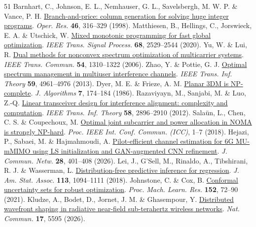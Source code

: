 \documentclass[10pt,letterpaper]{article}
\begin{document}
\begin{thebibliography}{51}
 Barnhart, C., Johnson, E. L., Nemhauser, G. L., Savelsbergh, M. W. P. \& Vance, P. H. \href{https://doi.org/10.1287/opre.46.3.316}{Branch-and-price: column generation for solving huge integer programs}. \emph{Oper. Res.} \textbf{46}, 316–329 (1998).
 Matthiesen, B., Hellings, C., Jorswieck, E. A. \& Utschick, W. \href{https://doi.org/10.1109/TSP.2020.2983284}{Mixed monotonic programming for fast global optimization}. \emph{IEEE Trans. Signal Process.} \textbf{68}, 2529–2544 (2020).
 Yu, W. \& Lui, R. \href{https://doi.org/10.1109/TCOMM.2006.877962}{Dual methods for nonconvex spectrum optimization of multicarrier systems}. \emph{IEEE Trans. Commun.} \textbf{54}, 1310–1322 (2006).
 Zhao, Y. \& Pottie, G. J. \href{https://doi.org/10.1109/TIT.2013.2255731}{Optimal spectrum management in multiuser interference channels}. \emph{IEEE Trans. Inf. Theory} \textbf{59}, 4961–4976 (2013).
 Dyer, M. E. \& Frieze, A. M. \href{https://doi.org/10.1016/0196-6774(86)90002-7}{Planar 3DM is NP-complete}. \emph{J. Algorithms} \textbf{7}, 174–184 (1986).
 Razaviyayn, M., Sanjabi, M. \& Luo, Z.-Q. \href{https://doi.org/10.1109/TIT.2012.2184909}{Linear transceiver design for interference alignment: complexity and computation}. \emph{IEEE Trans. Inf. Theory} \textbf{58}, 2896–2910 (2012).
 Salaün, L., Chen, C. S. \& Coupechoux, M. \href{https://doi.org/10.1109/ICC.2018.8422362}{Optimal joint subcarrier and power allocation in NOMA is strongly NP-hard}. \emph{Proc. IEEE Int. Conf. Commun. (ICC)}, 1–7 (2018).
 Hejazi, P., Sabaei, M. \& Hajmahmoudi, A. \href{https://doi.org/10.23919/JCN.2025.000112}{Pilot-efficient channel estimation for 6G MU-mMIMO using LS initialization and GAN-augmented CNN refinement}. \emph{J. Commun. Netw.} \textbf{28}, 401–408 (2026).
 Lei, J., G’Sell, M., Rinaldo, A., Tibshirani, R. J. \& Wasserman, L. \href{https://doi.org/10.1080/01621459.2017.1307116}{Distribution-free predictive inference for regression}. \emph{J. Am. Stat. Assoc.} \textbf{113}, 1094–1111 (2018).
 Johnstone, C. \& Cox, B. \href{https://proceedings.mlr.press/v152/johnstone21a.html}{Conformal uncertainty sets for robust optimization}. \emph{Proc. Mach. Learn. Res.} \textbf{152}, 72–90 (2021).
 Kludze, A., Bodet, D., Jornet, J. M. \& Ghasempour, Y. \href{https://doi.org/10.1038/s41467-026-71793-2}{Distributed wavefront shaping in radiative near-field sub-terahertz wireless networks}. \emph{Nat. Commun.} \textbf{17}, 5595 (2026).

\end{thebibliography}
\end{document}
